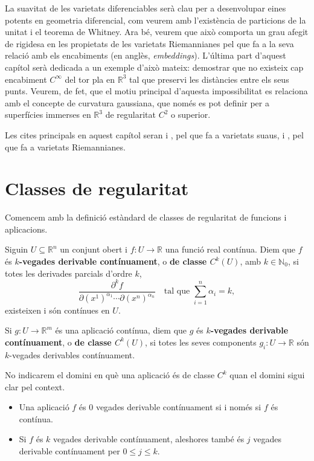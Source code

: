 La suavitat de les varietats diferenciables serà clau per a desenvolupar eines potents en geometria diferencial, com veurem amb l'existència de particions de la unitat i el teorema de Whitney. Ara bé, veurem que això comporta un grau afegit de rigidesa en les propietats de les varietats Riemannianes pel que fa a la seva relació amb els encabiments (en anglès, \textit{embeddings}). L'última part d'aquest capítol serà dedicada a un exemple d'això mateix: demostrar que no existeix cap encabiment  $C^\infty$ del tor pla en $\mathbb R^3$ tal que preservi les distàncies entre els seus punts. Veurem, de fet, que el motiu principal d'aquesta impossibilitat es relaciona amb el concepte de curvatura gaussiana, que només es pot definir per a superfícies immerses en $\mathbb R^3$ de regularitat $C^2$ o superior. 

Les cites principals en aquest capítol seran \cite{lee2013} i \cite{warner1983}, pel que fa a varietats suaus, i \cite{chavel2006}, pel que fa a varietats Riemannianes.

\section{Classes de regularitat}
Comencem amb la definició estàndard de classes de regularitat de funcions i aplicacions.
\begin{defi}
    Siguin $U\subseteq\mathbb R^n$ un conjunt obert i $f:U\to\mathbb R$ una funció real contínua.
    Diem que $f$ és \textbf{ $k$-vegades derivable contínuament}, o \textbf{de classe $C^k(U)$}, amb $k\in\mathbb N_0$, si totes les derivades parcials d'ordre $k$, \begin{equation*}
        \frac{\partial^k f}{\partial (x^1)^{\alpha_1}\cdots\partial (x^n)^{\alpha_n}}\quad\text{tal que }\sum_{i=1}^n\alpha_i = k,
    \end{equation*} existeixen i són contínues en $U$.

    Si $g:U\to\mathbb R^m$ és una aplicació contínua, diem que $g$ és \textbf{ $k$-vegades derivable contínuament}, o \textbf{de classe $C^k(U)$}, si totes les seves components $g_i:U\to\mathbb R$ són $k$-vegades derivables contínuament.
\end{defi}
\begin{nota}
    No indicarem el domini en què una aplicació és de classe $C^k$ quan el domini sigui clar pel context.
\end{nota}

\begin{obss}
\end{obss}
\begin{itemize}
    \item Una aplicació $f$ és $0$ vegades derivable contínuament si i només si $f$ és contínua. 
    \item Si $f$ és $k$ vegades derivable contínuament, aleshores també és $j$ vegades derivable contínuament per $0\le j\le k$.
\end{itemize}

